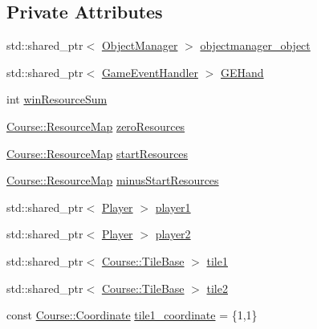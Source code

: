 \subsection*{Private Attributes}
\begin{DoxyCompactItemize}
\item 
std\-::shared\-\_\-ptr$<$ \hyperlink{classGame_1_1ObjectManager}{Object\-Manager} $>$ \hyperlink{classdefault__objectmanager_af5fd4a43346407b2813199cb58ba898d}{objectmanager\-\_\-object}
\item 
std\-::shared\-\_\-ptr$<$ \hyperlink{classGame_1_1GameEventHandler}{Game\-Event\-Handler} $>$ \hyperlink{classdefault__objectmanager_af3397bf426ecdc890c61d3d69701deff}{G\-E\-Hand}
\item 
int \hyperlink{classdefault__objectmanager_af38ed335952982ee29259ce5df67e18e}{win\-Resource\-Sum}
\item 
\hyperlink{namespaceCourse_ab9a46ed9cd00485e318e5731ea2f78d9}{Course\-::\-Resource\-Map} \hyperlink{classdefault__objectmanager_a86108da49a76801538881c75d2a395db}{zero\-Resources}
\item 
\hyperlink{namespaceCourse_ab9a46ed9cd00485e318e5731ea2f78d9}{Course\-::\-Resource\-Map} \hyperlink{classdefault__objectmanager_a228d3b342c250174d8f9924f6dd3d711}{start\-Resources}
\item 
\hyperlink{namespaceCourse_ab9a46ed9cd00485e318e5731ea2f78d9}{Course\-::\-Resource\-Map} \hyperlink{classdefault__objectmanager_a4a0cec3d5392cd32d7406877af357259}{minus\-Start\-Resources}
\item 
std\-::shared\-\_\-ptr$<$ \hyperlink{classGame_1_1Player}{Player} $>$ \hyperlink{classdefault__objectmanager_a1add15cff9927fa0ca0891d83db2aa66}{player1}
\item 
std\-::shared\-\_\-ptr$<$ \hyperlink{classGame_1_1Player}{Player} $>$ \hyperlink{classdefault__objectmanager_acd2b50e95f595209f088bffa2a5b0bf9}{player2}
\item 
std\-::shared\-\_\-ptr$<$ \hyperlink{classCourse_1_1TileBase}{Course\-::\-Tile\-Base} $>$ \hyperlink{classdefault__objectmanager_a083c627bb3cb830a59837af57933274e}{tile1}
\item 
std\-::shared\-\_\-ptr$<$ \hyperlink{classCourse_1_1TileBase}{Course\-::\-Tile\-Base} $>$ \hyperlink{classdefault__objectmanager_a822a88e652f6af04e9046f011844a12c}{tile2}
\item 
const \hyperlink{classCourse_1_1Coordinate}{Course\-::\-Coordinate} \hyperlink{classdefault__objectmanager_ac534d6d0d5db5425a0aeb95c84a6da17}{tile1\-\_\-coordinate} = \{1,1\}

\end{DoxyCompactItemize}
